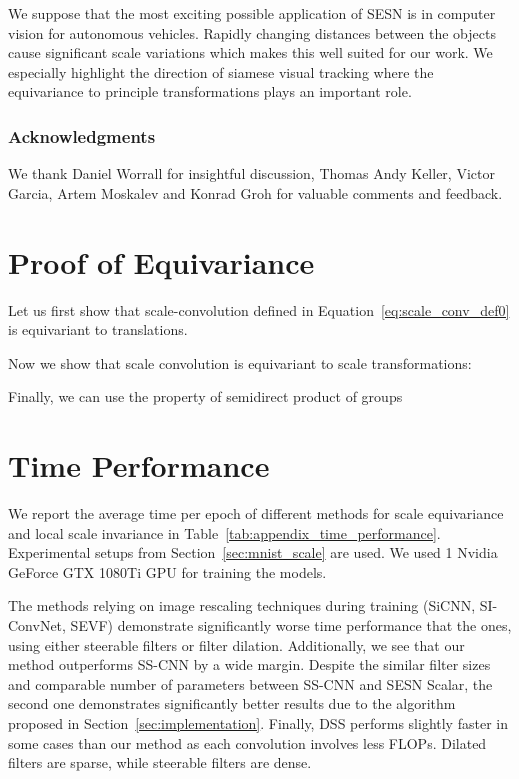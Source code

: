 \documentclass{article} \usepackage{multirow}
\def\Tabref#1{Table~\ref{#1}}
\def\Secref#1{Section~\ref{#1}}
\def\Eqref#1{Equation~\ref{#1}}
\begin{document}
We suppose that the most exciting possible application of SESN is in computer vision for 
autonomous vehicles. Rapidly changing distances between the objects 
cause significant scale variations which makes this well suited for our work.
We especially highlight the direction of siamese visual tracking 
where the equivariance to principle transformations plays an important role.


 
\subsubsection*{Acknowledgments}
We thank Daniel Worrall for insightful discussion, Thomas Andy Keller, Victor Garcia, 
Artem Moskalev and Konrad Groh for valuable comments and feedback.





\appendix
\newpage
\section{Proof of Equivariance}
\label{sec:appendix_proof}
Let us first show that scale-convolution defined in \Eqref{eq:scale_conv_def0} is equivariant to translations.



Now we show that scale convolution is equivariant to scale transformations:


Finally, we can use the property of semidirect product of groups


\newpage 
\section{Time Performance}
\label{sec:appendix_time}
We report the average time per epoch of different methods for scale equivariance
and local scale invariance in \Tabref{tab:appendix_time_performance}. 
Experimental setups from \Secref{sec:mnist_scale} are used. 
We used 1 Nvidia GeForce GTX 1080Ti GPU for training the models.

The methods relying on image rescaling techniques during training 
(SiCNN, SI-ConvNet, SEVF) demonstrate significantly worse time performance that 
the ones, using either steerable filters or filter dilation. Additionally, we see 
that our method outperforms SS-CNN by a wide margin. Despite the similar 
filter sizes and comparable number of parameters between SS-CNN and SESN Scalar, the 
second one demonstrates significantly better results due to the algorithm proposed in \Secref{sec:implementation}.
Finally, DSS performs slightly faster in some cases than our method as each convolution involves less FLOPs. Dilated filters 
are sparse, while steerable filters are dense. 
\end{document}

